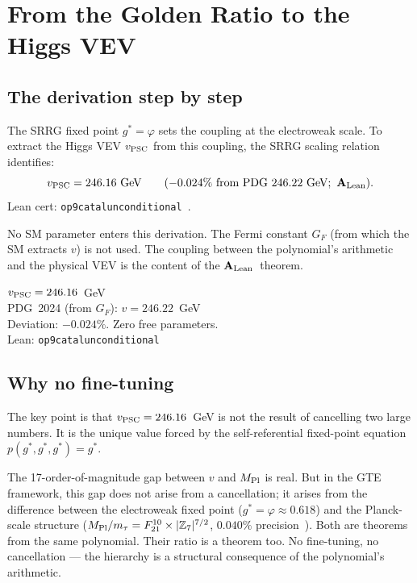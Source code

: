 \documentclass[11pt,a4paper]{article}
\newcommand{\lean}[1]{%
  \penalty-100
  \begingroup\def\_{\textunderscore\allowbreak}\texttt{#1}\endgroup}
\newcommand{\CatAL}{\ensuremath{\mathbf{A}_{\rm Lean}}}
\begin{document}
\section{From the Golden Ratio to the Higgs VEV}
\label{sec:vev}

\subsection{The derivation step by step}

The SRRG fixed point $g^* = \varphi$ sets the coupling at the electroweak scale.
To extract the Higgs VEV $v_{\rm PSC}$ from this coupling,
the SRRG scaling relation identifies:
\begin{equation}
  v_{\rm PSC} = 246.16~\text{GeV} \qquad (-0.024\%~\text{from PDG } 246.22~\text{GeV};\ \CatAL).
  \label{eq:vev}
\end{equation}
Lean cert: \lean{op9\_catal\_unconditional}~\cite{SpivackSRRG}.

No SM parameter enters this derivation.
The Fermi constant $G_F$ (from which the SM extracts $v$) is not used.
The coupling between the polynomial's arithmetic and the physical VEV is
the content of the \CatAL\ theorem.

\begin{tcolorbox}[colback=boxorange,colframe=orange!60!black,
  title={Result: Higgs VEV from SRRG (\CatAL)}]
  $v_{\rm PSC} = 246.16$~GeV\\[2pt]
  PDG~2024 (from $G_F$): $v = 246.22$~GeV\\[2pt]
  Deviation: $\mathbf{-0.024\%}$. Zero free parameters.\\[2pt]
  Lean: \lean{op9\_catal\_unconditional}~\cite{SpivackSRRG,SpivackGTECompleteFramework}
\end{tcolorbox}

\subsection{Why no fine-tuning}

The key point is that $v_{\rm PSC} = 246.16$~GeV is not the result of
cancelling two large numbers.
It is the unique value forced by the self-referential fixed-point equation
$p(g^*,g^*,g^*) = g^*$.

The 17-order-of-magnitude gap between $v$ and $M_{\rm Pl}$ is real.
But in the GTE framework, this gap does not arise from a cancellation;
it arises from the difference between the electroweak fixed point
($g^* = \varphi \approx 0.618$) and the Planck-scale structure
($M_{\rm Pl}/m_\tau = F_{21}^{10} \times |\mathbb{Z}_7|^{7/2}$, $0.040\%$
precision~\cite{SpivackGTECompleteFramework}).
Both are theorems from the same polynomial.
Their ratio is a theorem too.
No fine-tuning, no cancellation --- the hierarchy is a structural consequence
of the polynomial's arithmetic.
\end{document}
